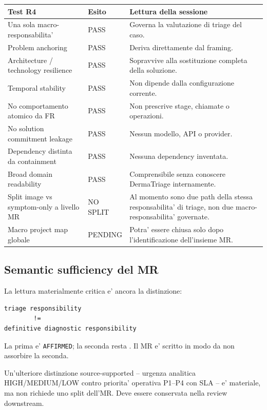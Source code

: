 \documentclass[11pt,a4paper]{article}
\begin{document}
\begin{longtable}{L{49mm}L{21mm}L{76mm}}
\toprule
\textbf{Test R4} & \textbf{Esito} & \textbf{Lettura della sessione} \\
\midrule
\endhead
Una sola macro-responsabilita' & PASS & Governa la valutazione di triage del caso. \\
Problem anchoring & PASS & Deriva direttamente dal framing. \\
Architecture / technology resilience & PASS & Sopravvive alla sostituzione completa della soluzione. \\
Temporal stability & PASS & Non dipende dalla configurazione corrente. \\
No comportamento atomico da FR & PASS & Non prescrive stage, chiamate o operazioni. \\
No solution commitment leakage & PASS & Nessun modello, API o provider. \\
Dependency distinta da containment & PASS & Nessuna dependency inventata. \\
Broad domain readability & PASS & Comprensibile senza conoscere DermaTriage internamente. \\
Split image vs symptom-only a livello MR & NO SPLIT & Al momento sono due path della stessa responsabilita' di triage, non due macro-responsabilita' governate. \\
Macro project map globale & PENDING & Potra' essere chiusa solo dopo l'identificazione dell'insieme MR. \\
\bottomrule
\end{longtable}

\subsection{Semantic sufficiency del MR}

La lettura materialmente critica e' ancora la distinzione:

\begin{lstlisting}
triage responsibility
        !=
definitive diagnostic responsibility
\end{lstlisting}

La prima e' \texttt{AFFIRMED}; la seconda resta \NS. Il MR e' scritto in modo da non assorbire la seconda.

Un'ulteriore distinzione source-supported -- urgenza analitica HIGH/MEDIUM/LOW contro priorita' operativa P1--P4 con SLA -- e' materiale, ma non richiede uno split dell'MR. Deve essere conservata nella review downstream.
\end{document}
